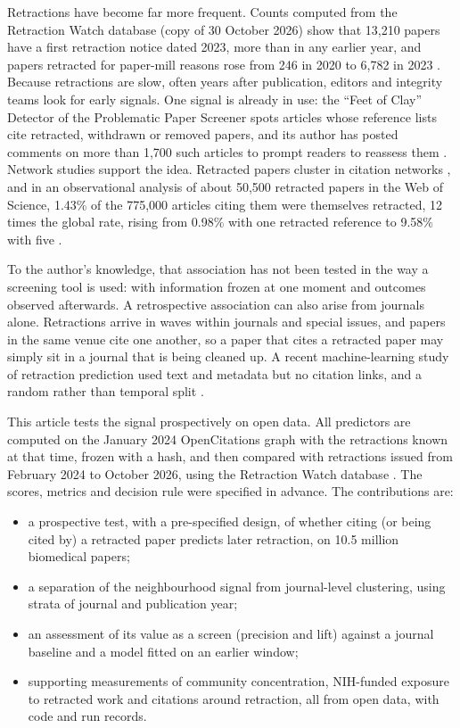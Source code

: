 \documentclass[pdflatex,sn-basic]{sn-jnl}
\begin{document}
Retractions have become far more frequent. Counts computed from the Retraction Watch database (copy of 30 October 2026) show that 13,210 papers
have a first retraction notice dated 2023, more than in any earlier year, and papers retracted for paper-mill reasons rose from 246 in 2020 to
6,782 in 2023
\citep{rittman2025rw,candal2022papermills}. Because retractions are slow, often years after publication, editors and integrity
teams look for early signals. One signal is already in use: the ``Feet of Clay'' Detector of the Problematic Paper
Screener \citep{cabanac2022pps} spots articles whose reference lists cite retracted, withdrawn or removed papers, and
its author has posted comments on more than 1,700 such articles to prompt readers to reassess them
\citep{cabanac2024chain}. Network studies support the idea. Retracted papers cluster in citation networks
\citep{feng2024molbio,candal2024references}, and in an observational analysis of about 50,500 retracted papers in the Web of
Science, 1.43\% of the 775,000 articles citing them were themselves retracted, 12 times the global rate, rising from
0.98\% with one retracted reference to 9.58\% with five \citep{lou2026beyond}.

To the author's knowledge, that association has not been tested in the way a screening tool is used: with information frozen at one moment and
outcomes observed afterwards. A retrospective association can also arise from journals alone. Retractions arrive in
waves within journals and special issues, and papers in the same venue cite one another, so a paper that cites a
retracted paper may simply sit in a journal that is being cleaned up. A recent machine-learning study of
retraction prediction used text and metadata but no citation links, and a random rather than temporal split
\citep{fletcher2025predicting}.

This article tests the signal prospectively on open data. All predictors are computed on the January 2024
OpenCitations graph \citep{arjomandi2024dataset} with the retractions known at that time, frozen with a hash, and then
compared with retractions issued from February 2024 to October 2026, using the Retraction Watch database
\citep{rittman2025rw}. The scores, metrics and decision rule were specified in advance. The contributions are:
\begin{itemize}
\item a prospective test, with a pre-specified design, of whether citing (or being cited by) a retracted paper predicts later
retraction, on 10.5 million biomedical papers;
\item a separation of the neighbourhood signal from journal-level clustering, using strata of journal and publication
year;
\item an assessment of its value as a screen (precision and lift) against a journal baseline and a model fitted on an
earlier window;
\item supporting measurements of community concentration, NIH-funded exposure to retracted work and citations around
retraction, all from open data, with code and run records.
\end{itemize}
\end{document}
